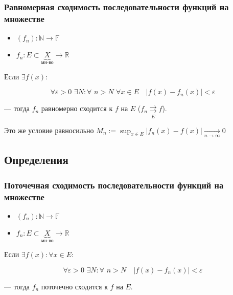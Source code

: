 \documentclass{article}
\def\dbl{\,\,}
\def\rsh#1{\underset{#1}{\rightrightarrows}}
\def\rshe{\rsh{E}}
\begin{document}
\subsubsection{Равномерная сходимость последовательности функций на множестве}

\begin{itemize}
    \item $(f_n): \mathbb{N} \rightarrow \mathbb{F}$
    \item $f_n: E \subset \underbrace{X}_{\text{мн-во}} \rightarrow \mathbb{R}$
\end{itemize}

Если $\exists f(x)$:

\[\forall \varepsilon > 0 \dbl \exists N: \forall \dbl n > N \dbl \forall x \in E \quad |f(x) - f_n(x)| < \varepsilon\]

--- тогда $f_n$ равномерно сходится к $f$ на $E$ ($f_n \rshe f$).

Это же условие равносильно $M_n := \sup_{x \in E} |f_n(x) - f(x)| \underset{n \rightarrow \infty}{\rightarrow} 0 $

\newpage

\subsection{Определения}



\subsubsection{Поточечная сходимость последовательности функций на множестве}

\begin{itemize}
    \item $(f_n): \mathbb{N} \rightarrow \mathbb{F}$
    \item $f_n: E \subset \underbrace{X}_{\text{мн-во}} \rightarrow \mathbb{R}$
\end{itemize}

Если $\exists f(x): \forall x \in E$:

\[\forall \varepsilon > 0 \dbl \exists N: \forall \dbl n > N \quad |f(x) - f_n(x)| < \varepsilon\]

--- тогда $f_n$ поточечно сходится к $f$ на $E$.
\end{document}
